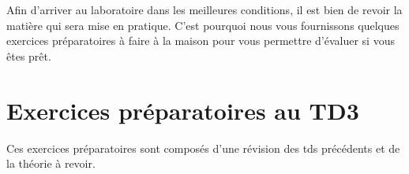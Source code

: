 \documentclass[a4paper,11pt]{article}
\date{2018 -- 2019}
\begin{document}
\entete
\titre
{}
\lastedit


	\begin{consigne}
	Afin d'arriver au laboratoire dans les meilleures conditions, il est bien de revoir la mati\`ere qui sera mise en pratique.
         C'est pourquoi nous vous fournissons quelques exercices pr\'eparatoires \`a faire \`a la maison pour vous permettre d'\'evaluer si vous \^etes pr\^et.  
	\end{consigne}
	
	\tableofcontents

	\newpage


				
 \section{Exercices pr\'eparatoires au TD3} 
  	Ces exercices pr\'eparatoires sont compos\'es d'une r\'evision des tds pr\'ec\'edents et de la th\'eorie \`a revoir.  
	
				
\end{document}

